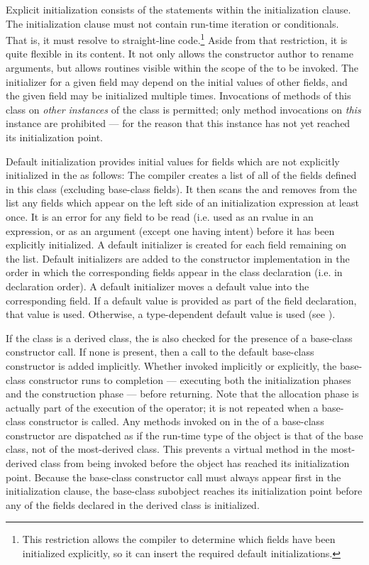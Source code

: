 Explicit initialization consists of the statements within the initialization
clause.  The initialization clause must not contain run-time iteration or
conditionals.  That is, it must resolve to straight-line code.\footnote{This
restriction allows the compiler to determine which fields have been initialized
explicitly, so it can insert the required default initializations.}
Aside from that restriction, it is quite flexible in its content.  It not only allows the constructor
author to rename arguments, but allows routines visible within the scope of
the  to be invoked.  The initializer for a given
field may depend on the initial values of other fields, and the given field may be
initialized multiple times.  Invocations of methods of this
class on \emph{other instances} of the class is permitted; only method
invocations on \emph{this} instance are prohibited --- for the reason that this
instance has not yet reached its initialization point.

Default initialization provides initial values for fields which are not
explicitly initialized in the  as follows:  The
compiler creates a list of all of the fields defined in this class (excluding
base-class fields).  It then scans the  and removes
from the list any fields which appear on the left side of an initialization
expression at least once.  It is an error for any field to be read (i.e. used as
an rvalue in an expression, or as an argument (except one having  intent)
before it has been explicitly initialized.  
A default initializer is created for each field remaining on the list.  Default
initializers are added to the constructor implementation in the order in which
the corresponding fields appear in the class declaration (i.e. in declaration
order).  A default initializer moves a default value into the corresponding
field.  If a default value is provided as part of the field declaration, that
value is used.  Otherwise, a type-dependent default value is used
(see ).

If the class is a derived class, the  is also
checked for the presence of a base-class constructor call.  If none is present,
then a call to the default base-class constructor is added implicitly.
Whether invoked implicitly or explicitly, the base-class constructor runs to
completion --- executing both the initialization phases and the construction
phase --- before returning.  Note that the allocation phase is actually part of
the execution of the  operator; it is not repeated when a base-class
constructor is called.
Any methods invoked on  in
the  of a base-class constructor are dispatched as if the
run-time type of the object is that of the base class, not of the most-derived
class.  This prevents a virtual method in the most-derived class from being
invoked before the object has reached its initialization point.  Because the
base-class constructor call must always appear first in the initialization clause,
the base-class subobject reaches its initialization point before any of the
fields declared in the derived class is initialized.

